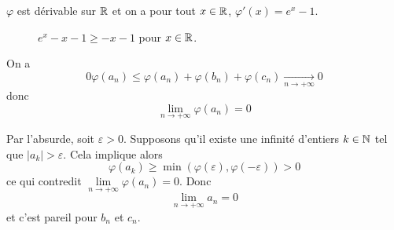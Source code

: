 \begin{solution}
	$\varphi$ est dérivable sur $\mathbb{R}$ et on a pour tout $x\in\mathbb{R}$, $\varphi'(x)=e^{x}-1$.

	\begin{figure}[ht!]
		\centering
		\caption{$e^{x}-x-1\geqslant -x-1$ pour $x\in\mathbb{R}$.}
	\end{figure}

	On a 
	$$0\varphi(a_{n})\leqslant\varphi(a_{n})+\varphi(b_{n})+\varphi(c_{n})\xrightarrow[n\to+\infty]{}0$$
	donc $$\lim\limits_{n\to+\infty}\varphi(a_{n})=0$$

	Par l'absurde, soit $\varepsilon>0$. Supposons qu'il existe une infinité d'entiers $k\in\mathbb{N}$ tel que $\vert a_{k}\vert>\varepsilon$. Cela implique alors
	$$\varphi(a_{k})\geqslant\min(\varphi(\varepsilon),\varphi(-\varepsilon))>0$$
	ce qui contredit $\lim\limits_{n\to+\infty}\varphi(a_{n})=0$.
	Donc 
	$$\boxed{\lim\limits_{n\to+\infty}a_{n}=0}$$
	et c'est pareil pour $b_{n}$ et $c_{n}$.
\end{solution}


